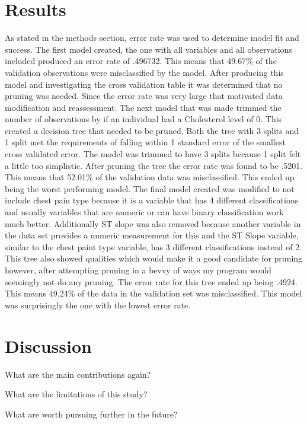 \documentclass[12pt]{article}
\begin{document}
\section{Results}
\label{sec:resu}
As stated in the methods section, error rate was used to determine model fit and success.
The first model created, the one with all variables and all observations included produced an  error rate of .496732. This means that 49.67\% of the validation observations were misclassified by the model. After producing this model and investigating the cross validation table it was determined that no pruning was needed. Since the error rate was very large that motivated data modification and reassessment.
The next model that was made trimmed the number of observations by if an individual had a Cholesterol level of 0. This created a decision tree that needed to be pruned. Both the tree with 3 splits and 1 split met the requirements of falling within 1 standard error of the smallest cross validated error. The model was trimmed to have 3 splits because 1 split felt a little too simplistic. After pruning the tree the error rate was found to be .5201. This means that 52.01\% of the validation data was misclassified. This ended up being the worst performing model.
The final model created was modified to not include chest pain type because it is a variable that has 4 different classifications and usually variables that are numeric or can have binary classification work much better. Additionally ST slope was also removed because another variable in the data set provides a numeric measurement for this and the ST Slope variable, similar to the chest paint type variable, has 3 different classifications instead of 2. This tree also showed qualities which would make it a good candidate for pruning however, after attempting pruning in a bevvy of ways my program would seemingly not do any pruning. The error rate for this tree ended up being .4924. This means 49.24\% of the data in the validation set was misclassified. This model was surprisingly the one with the lowest error rate.

\section{Discussion}
\label{sec:disc}

What are the main contributions again?

What are the limitations of this study?

What are worth pursuing further in the future?



\end{document}
